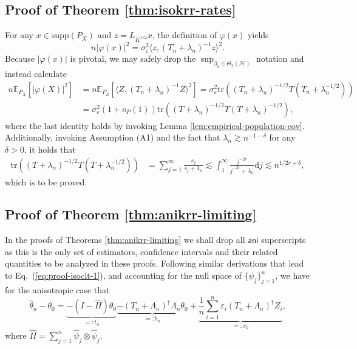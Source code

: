 \documentclass[11pt,a4paper]{article}
\renewcommand{\hat}{\widehat}
\newcommand{\tr}{\mathrm{tr}}
\theoremstyle{definition}
\theoremstyle{plain}
\theoremstyle{remark}
\newcommand{\supp}{\mathrm{supp}}
\newcommand{\ud}{\mathrm d}
\newcommand{\mH}{\mathcal H}
\newcommand{\ani}{\mathsf{ani}}
\begin{document}
\subsection{Proof of Theorem \ref{thm:isokrr-rates}}

For any $x\in\supp(P_X)$ and $z=L_{K^{1/2}}x$, the definition of $\varphi(x)$ yields
$$
n\big|\varphi(x)\big|^2 = \sigma_\varepsilon^2\langle z, (T_n+\lambda_n)^{-1}z\rangle^2.
$$
Because $|\varphi(x)|$ is pivotal, we may safely drop the $\sup_{\beta_0\in\Theta_2(\mH)}$ notation and instead calculate
\begin{align*}
n\mathbb E_{P_X}\left[|\varphi(X)|^2\right] &= n\mathbb E_{P_Z}[\langle Z,(T_n+\lambda_n)^{-1}Z\rangle^2] = \sigma_\varepsilon^2\tr((T_n+\lambda_n)^{-1/2}T(T_n+\lambda_n^{-1/2}))\\
&= \sigma_\varepsilon^2(1+o_P(1))\tr((T+\lambda_n)^{-1/2}T(T+\lambda_n)^{-1/2}),
\end{align*}
where the last identity holds by invoking Lemma \ref{lem:empirical-population-cov}. Additionally, invoking Assumption (A1) and the fact that $\lambda_n\gtrsim n^{-1-\delta}$ for any $\delta>0$, it holds that
\begin{align*}
\tr((T+\lambda_n)^{-1/2}T(T+\lambda_n^{-1/2})) &= \sum_{j=1}^{\infty} \frac{s_j}{s_j+\lambda_n} \lesssim \int_1^{\infty}\frac{j^{-2r}}{j^{-2r}+\lambda_n}\ud j\lesssim n^{1/2r+\delta},
\end{align*}
which is to be proved.

\subsection{Proof of Theorem \ref{thm:anikrr-limiting}}

In the proofs of Theorems \ref{thm:anikrr-limiting} we shall drop all $\ani$ superscripts as this is the only set of estimators, confidence intervals and their related quantities to be analyzed in these proofs.
Following similar derivations that lead to Eq.~(\ref{eq:proof-isoclt-1}), and accounting for the null space of $\{\hat\psi_j\}_{j=1}^n$, we have for the anisotropic case that
\begin{equation}
\hat\theta_n-\theta_0 =\underbrace{-(I-\hat\Pi)\theta_0}_{=:t_n}\underbrace{- (T_n+\Lambda_n)^{\dagger}\Lambda_n\theta_0}_{=: b_n} + \underbrace{\frac{1}{n}\sum_{i=1}^n\varepsilon_i(T_n+\Lambda_n)^{\dagger}Z_i}_{=:v_n},
\label{eq:proof-aniclt-1}
\end{equation}
where $\hat\Pi = \sum_{j=1}^n\hat\psi_j\otimes\hat\psi_j$.
\end{document}
